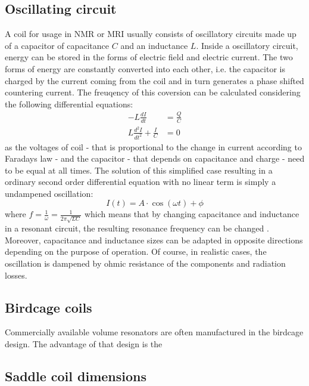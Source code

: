             \subsection{Oscillating circuit}
                A coil for usage in NMR or MRI usually consists of oscillatory circuits made up of a capacitor of capacitance $C$ and an inductance $L$. Inside a oscillatory circuit, energy can be stored in the forms of electric field and electric current. The two forms of energy are constantly converted into each other, i.e. the capacitor is charged by the current coming from the coil and in turn generates a phase shifted countering current. The freuqency of this coversion can be calculated considering the following differential equations:
                \begin{equation}
                    \begin{aligned}
                        -L\frac{dI}{dt} &= \frac{Q}{C} \\
                        L\frac{d^2I}{dt^2} + \frac{I}{C} &= 0
                    \end{aligned}
                \end{equation}
                as the voltages of coil - that is proportional to the change in current according to Faradays law - and the capacitor - that depends on capacitance and charge - need to be equal at all times. The solution of this simplified case resulting in a ordinary second order differential equation with no linear term is simply a undampened oscillation:
                \begin{equation}
                    I(t) =  A \cdot \cos(\omega t) + \phi 
                \end{equation}
                where $f= \frac{1}{\omega} = \frac{1}{2\pi\sqrt{LC}}$ which means that by changing capacitance and inductance in a resonant circuit, the resulting resonance frequency can be changed \cite{rao_electronic_2011}. Moreover, capacitance and inductance sizes can be adapted in opposite directions depending on the purpose of operation.
                Of course, in realistic cases, the oscillation is dampened by ohmic resistance of the components and radiation losses.
            \subsection{Birdcage coils}
            Commercially available volume resonators are often manufactured in the birdcage design. The advantage of that design is the 
            \subsection{Saddle coil dimensions}
